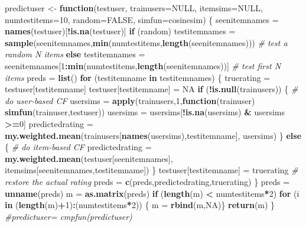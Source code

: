 \documentclass[]{article}
\newenvironment{Shaded}{\begin{snugshade}}{\end{snugshade}}
\newcommand{\CommentTok}[1]{\textcolor[rgb]{0.56,0.35,0.01}{\textit{#1}}}
\newcommand{\ControlFlowTok}[1]{\textcolor[rgb]{0.13,0.29,0.53}{\textbf{#1}}}
\newcommand{\DataTypeTok}[1]{\textcolor[rgb]{0.13,0.29,0.53}{#1}}
\newcommand{\DecValTok}[1]{\textcolor[rgb]{0.00,0.00,0.81}{#1}}
\newcommand{\KeywordTok}[1]{\textcolor[rgb]{0.13,0.29,0.53}{\textbf{#1}}}
\newcommand{\NormalTok}[1]{#1}
\newcommand{\OperatorTok}[1]{\textcolor[rgb]{0.81,0.36,0.00}{\textbf{#1}}}
\newcommand{\OtherTok}[1]{\textcolor[rgb]{0.56,0.35,0.01}{#1}}
\newcommand{\StringTok}[1]{\textcolor[rgb]{0.31,0.60,0.02}{#1}}
\begin{document}
\begin{Shaded}
\begin{Highlighting}[]
\NormalTok{predictuser <-}\StringTok{ }\ControlFlowTok{function}\NormalTok{(testuser, }\DataTypeTok{trainusers=}\OtherTok{NULL}\NormalTok{, }\DataTypeTok{itemsims=}\OtherTok{NULL}\NormalTok{, }\DataTypeTok{numtestitems=}\DecValTok{10}\NormalTok{, }\DataTypeTok{random=}\OtherTok{FALSE}\NormalTok{, }\DataTypeTok{simfun=}\NormalTok{cosinesim) \{}
\NormalTok{  seenitemnames   =}\StringTok{ }\KeywordTok{names}\NormalTok{(testuser)[}\OperatorTok{!}\KeywordTok{is.na}\NormalTok{(testuser)]}
  \ControlFlowTok{if}\NormalTok{ (random) testitemnames =}\StringTok{ }\KeywordTok{sample}\NormalTok{(seenitemnames,}\KeywordTok{min}\NormalTok{(numtestitems,}\KeywordTok{length}\NormalTok{(seenitemnames))) }\CommentTok{# test a random N items}
  \ControlFlowTok{else}\NormalTok{ testitemnames =}\StringTok{ }\NormalTok{seenitemnames[}\DecValTok{1}\OperatorTok{:}\KeywordTok{min}\NormalTok{(numtestitems,}\KeywordTok{length}\NormalTok{(seenitemnames))] }\CommentTok{# test first N items}
\NormalTok{  preds =}\StringTok{ }\KeywordTok{list}\NormalTok{()}
  \ControlFlowTok{for}\NormalTok{ (testitemname }\ControlFlowTok{in}\NormalTok{ testitemnames) \{}
\NormalTok{    truerating =}\StringTok{ }\NormalTok{testuser[testitemname] }
\NormalTok{    testuser[testitemname] =}\StringTok{ }\OtherTok{NA}
    \ControlFlowTok{if}\NormalTok{ (}\OperatorTok{!}\KeywordTok{is.null}\NormalTok{(trainusers)) \{}
      \CommentTok{# do user-based CF}
\NormalTok{      usersims =}\StringTok{ }\KeywordTok{apply}\NormalTok{(trainusers,}\DecValTok{1}\NormalTok{,}\ControlFlowTok{function}\NormalTok{(trainuser) }\KeywordTok{simfun}\NormalTok{(trainuser,testuser))}
\NormalTok{      usersims =}\StringTok{ }\NormalTok{usersims[}\OperatorTok{!}\KeywordTok{is.na}\NormalTok{(usersims) }\OperatorTok{&}\StringTok{ }\NormalTok{usersims }\OperatorTok{>=}\DecValTok{0}\NormalTok{]}
\NormalTok{      predictedrating =}\StringTok{ }\KeywordTok{my.weighted.mean}\NormalTok{(trainusers[}\KeywordTok{names}\NormalTok{(usersims),testitemname], usersims)}
\NormalTok{    \}}
    \ControlFlowTok{else}\NormalTok{ \{}
      \CommentTok{# do item-based CF}
\NormalTok{      predictedrating =}\StringTok{ }\KeywordTok{my.weighted.mean}\NormalTok{(testuser[seenitemnames], itemsims[seenitemnames,testitemname])}
\NormalTok{    \}}
\NormalTok{    testuser[testitemname] =}\StringTok{ }\NormalTok{truerating }\CommentTok{# restore the actual rating}
\NormalTok{    preds =}\StringTok{ }\KeywordTok{c}\NormalTok{(preds,predictedrating,truerating)}
\NormalTok{  \}}
\NormalTok{  preds =}\StringTok{ }\KeywordTok{unname}\NormalTok{(preds)}
\NormalTok{  m =}\StringTok{ }\KeywordTok{as.matrix}\NormalTok{(preds)}
  \ControlFlowTok{if}\NormalTok{ (}\KeywordTok{length}\NormalTok{(m) }\OperatorTok{<}\StringTok{ }\NormalTok{numtestitems}\OperatorTok{*}\DecValTok{2}\NormalTok{) }\ControlFlowTok{for}\NormalTok{ (i }\ControlFlowTok{in}\NormalTok{ (}\KeywordTok{length}\NormalTok{(m)}\OperatorTok{+}\DecValTok{1}\NormalTok{)}\OperatorTok{:}\NormalTok{(numtestitems}\OperatorTok{*}\DecValTok{2}\NormalTok{)) \{ m =}\StringTok{ }\KeywordTok{rbind}\NormalTok{(m,}\OtherTok{NA}\NormalTok{)\}}
  \KeywordTok{return}\NormalTok{(m)}
\NormalTok{\}}
\CommentTok{#predictuser= cmpfun(predictuser)}


\end{Highlighting}
\end{Shaded}
\end{document}
